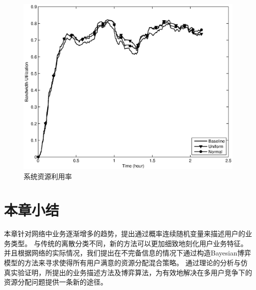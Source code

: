 \begin{figure}[!tb]
  \centering
  \begin{minipage}[t]{0.7\linewidth} 
    \centering 
    \includegraphics[width=\textwidth]{bayesian_time_vs_bw_utilization.eps} 
    \caption{系统资源利用率} 
    \label{fig:chap_bayesian:time_vs_bw_utilization} 
  \end{minipage} 
\end{figure}
\section{本章小结}
本章针对网络中业务逐渐增多的趋势，提出通过概率连续随机变量来描述用户的业务类型。
与传统的离散分类不同，新的方法可以更加细致地刻化用户业务特征。
并且根据网络的实际情况，我们提出在不完备信息的情况下通过构造Bayesian博弈模型的方法来寻求使得所有用户满意的资源分配混合策略。
通过理论的分析与仿真实验证明，所提出的业务描述方法及博弈算法，为有效地解决在多用户竞争下的资源分配问题提供一条新的途径。


